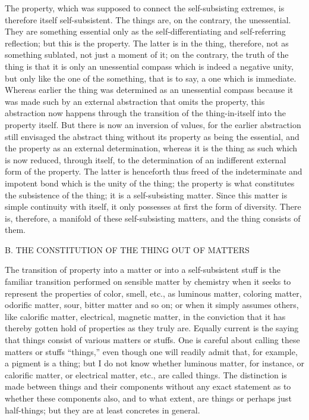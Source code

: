 The property, which was supposed to connect
the self-subsisting extremes,
is therefore itself self-subsistent.
The things are, on the contrary, the unessential.
They are something essential only as
the self-differentiating
and self-referring reflection;
but this is the property.
The latter is in the thing,
therefore, not as something sublated,
not just a moment of it;
on the contrary, the truth of the thing is
that it is only an unessential compass
which is indeed a negative unity,
but only like the one of the something,
that is to say, a one which is immediate.
Whereas earlier the thing was determined as
an unessential compass because it was made such
by an external abstraction that omits the property,
this abstraction now happens through the transition of
the thing-in-itself into the property itself.
But there is now an inversion of values,
for the earlier abstraction still envisaged
the abstract thing without its property
as being the essential,
and the property as an external determination,
whereas it is the thing as such which is now reduced,
through itself, to the determination of
an indifferent external form of the property.
The latter is henceforth thus freed of
the indeterminate and impotent bond
which is the unity of the thing;
the property is what constitutes
the subsistence of the thing;
it is a self-subsisting matter.
Since this matter is simple continuity with itself,
it only possesses at first the form of diversity.
There is, therefore, a manifold of
these self-subsisting matters,
and the thing consists of them.

B. THE CONSTITUTION OF THE THING OUT OF MATTERS

The transition of property into a matter
or into a self-subsistent stuff is the familiar
transition performed on sensible matter by chemistry
when it seeks to represent the properties of color, smell, etc.,
as luminous matter, coloring matter, odorific matter,
sour, bitter matter and so on;
or when it simply assumes others,
like calorific matter, electrical, magnetic matter,
in the conviction that it has thereby gotten hold
of properties as they truly are.
Equally current is the saying that
things consist of various matters or stuffs.
One is careful about calling these matters or stuffs “things,”
even though one will readily admit that,
for example, a pigment is a thing;
but I do not know whether luminous matter,
for instance, or calorific matter,
or electrical matter, etc., are called things.
The distinction is made between things and their components
without any exact statement as to whether these components also,
and to what extent, are things or perhaps just half-things;
but they are at least concretes in general.


